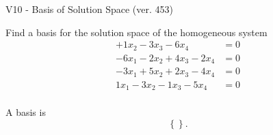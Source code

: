 \begin{exercise}
  \begin{exerciseTitle}V10 - Basis of Solution Space (ver. 453)\end{exerciseTitle}
  \begin{exerciseStatement}
    Find a basis for the solution space of the homogeneous system 
\begin{align*}
 + 1 x_ 2 -3 x_ 3 -6 x_ 4 &= 0  \\ 
  -6 x_ 1 -2 x_ 2 + 4 x_ 3 -2 x_ 4 &= 0  \\ 
  -3 x_ 1 + 5 x_ 2 + 2 x_ 3 -4 x_ 4 &= 0  \\ 
  1 x_ 1 -3 x_ 2 -1 x_ 3 -5 x_ 4 &= 0  \\ 
 \end{align*}


 
  \end{exerciseStatement}

  \begin{exerciseAnswer}
   A basis is   
\[\left\{\right\}.\]

  


  \end{exerciseAnswer}
\end{exercise}